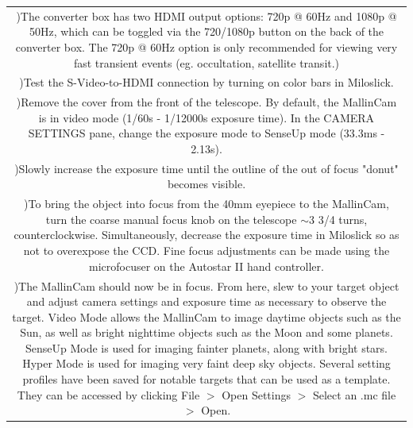 \documentclass[12pt,titlepage]{article}
\newcounter{rowcount}
\newcommand{\step}{\stepcounter{rowcount}\therowcount)\hspace*{\tabcolsep}}
\begin{document}
\begin{longtable}{c}    
    \multicolumn{1}{m{\textwidth}}{\step The converter box has two HDMI output options: 720p @ 60Hz and 1080p @ 50Hz, which can be toggled via the 720/1080p button on the back of the converter box. The 720p @ 60Hz option is only recommended for viewing very fast transient events (eg. occultation, satellite transit.)} \\[2em]
    
    \multicolumn{1}{m{\textwidth}}{\step Test the S-Video-to-HDMI connection by turning on color bars in Miloslick.} \\
    
    \multicolumn{1}{m{\textwidth}}{\step Remove the cover from the front of the telescope. By default, the MallinCam is in video mode (1/60s - 1/12000s exposure time). In the CAMERA SETTINGS pane, change the exposure mode to SenseUp mode (33.3ms - 2.13s).} \\
   
    \multicolumn{1}{m{\textwidth}}{\step Slowly increase the exposure time until the outline of the out of focus "donut" becomes visible.}\\
    
    \multicolumn{1}{m{\textwidth}}{\step To bring the object into focus from the 40mm eyepiece to the MallinCam, turn the coarse manual focus knob on the telescope $\sim$3 3/4 turns, counterclockwise. Simultaneously, decrease the exposure time in Miloslick so as not to overexpose the CCD. Fine focus adjustments can be made using the microfocuser on the Autostar II hand controller.}\\
    
   \multicolumn{1}{m{\textwidth}}{\step The MallinCam should now be in focus. From here, slew to your target object and adjust camera settings and exposure time as necessary to observe the target. Video Mode allows the MallinCam to image daytime objects such as the Sun, as well as bright nighttime objects such as the Moon and some planets. SenseUp Mode is used for imaging fainter planets, along with bright stars. Hyper Mode is used for imaging very faint deep sky objects. Several setting profiles have been saved for notable targets that can be used as a template. They can be accessed by clicking File $>$ Open Settings $>$ Select an .mc file $>$ Open.}
\end{longtable}
\end{document}
